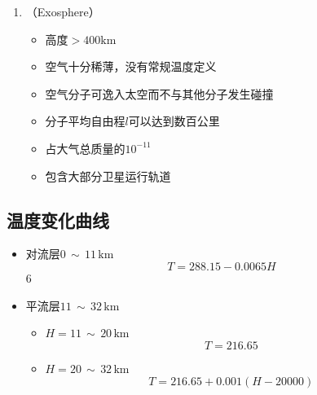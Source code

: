 \begin{enumerate}
	\item {}（Exosphere） \vspace*{-0.5em}
	\begin{itemize}
		\item 高度$ >  400 \text{km} $
		\item 空气十分稀薄，没有常规温度定义
		\item 空气分子可逸入太空而不与其他分子发生碰撞
		\item 分子平均自由程$l$可以达到数百公里
		\item 占大气总质量的$10^{-11}$
		\item 包含大部分卫星运行轨道
	\end{itemize}
	
\end{enumerate}

\subsection{温度变化曲线}

\begin{itemize}
	\item 对流层$ 0\, \sim \,  11 \,\text{km} $
	\begin{equation}
		T = 288.15 - 0.0065H
	\end{equation}
	6
	\item 平流层$ 11\, \sim \,  32 \,\text{km} $
	\begin{itemize}
		\item $H = 11 \, \sim \, 20 \, \text{km}$
		\begin{equation}
			T = 216.65
		\end{equation}
		\item $H = 20 \, \sim \, 32 \, \text{km}$
		\begin{equation}
			T = 216.65 + 0.001(H - 20000)
		\end{equation}
	\end{itemize}
\end{itemize}

